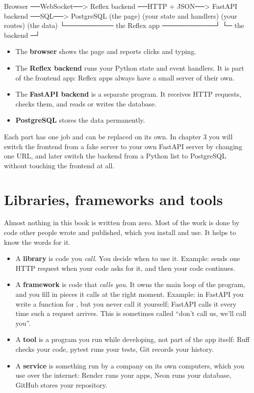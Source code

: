 \begin{code}
Browser ──WebSocket──> Reflex backend ──HTTP + JSON──> FastAPI backend ──SQL──> PostgreSQL
(the page)            (your state and handlers)        (your routes)            (the data)
└────────── the Reflex app ───────────┘              └─ the backend ─┘
\end{code}

\begin{itemize}
\item The \textbf{browser} shows the page and reports clicks and typing.
\item The \textbf{Reflex backend} runs your Python state and event handlers. It is part of the frontend app: Reflex apps always have a small server of their own.
\item The \textbf{FastAPI backend} is a separate program. It receives HTTP requests, checks them, and reads or writes the database.
\item \textbf{PostgreSQL} stores the data permanently.
\end{itemize}

Each part has one job and can be replaced on its own. In chapter 3 you will switch the frontend from a fake server to your own FastAPI server by changing one URL, and later switch the backend from a Python list to PostgreSQL without touching the frontend at all.


\section{Libraries, frameworks and tools}

Almost nothing in this book is written from zero. Most of the work is done by code other people wrote and published, which you install and use. It helps to know the words for it.

\begin{itemize}
\item A \textbf{library} is code you \emph{call}. You decide when to use it. Example:  sends one HTTP request when your code asks for it, and then your code continues.
\item A \textbf{framework} is code that \emph{calls you}. It owns the main loop of the program, and you fill in pieces it calls at the right moment. Example: in FastAPI you write a function for , but you never call it yourself; FastAPI calls it every time such a request arrives. This is sometimes called ``don't call us, we'll call you''.
\item A \textbf{tool} is a program you run while developing, not part of the app itself: Ruff checks your code, pytest runs your tests, Git records your history.
\item A \textbf{service} is something run by a company on its own computers, which you use over the internet: Render runs your apps, Neon runs your database, GitHub stores your repository.
\end{itemize}

